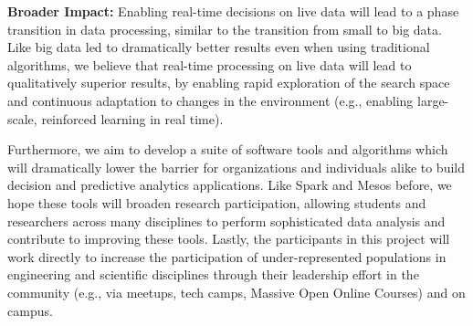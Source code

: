 \documentclass [10pt]{article}
\begin{document}
{{\bf Broader Impact:} Enabling real-time decisions on live data will lead to a phase transition in data processing, similar to the transition from small to big data. Like big data led to dramatically better results even when using traditional algorithms, we believe that real-time processing on live data will lead to qualitatively superior results, by enabling rapid exploration of the search space and continuous adaptation to changes in the environment (e.g., enabling large-scale, reinforced learning in real time).

Furthermore, we aim to develop a suite of software tools and algorithms which will dramatically lower the barrier for organizations and individuals alike to build decision and predictive analytics applications. Like Spark and Mesos before, we hope these tools will broaden research participation, allowing students and researchers across many disciplines to perform sophisticated data analysis and contribute to improving these tools. Lastly, the participants in this project will work directly to increase the participation of under-represented populations in engineering and scientific disciplines through their leadership effort in the community (e.g., via meetups, tech camps, Massive Open Online Courses) and on campus.


}
\newpage

\setcounter{section}{0}


\newpage
\pagestyle{plain}
\setcounter{page}{1}
\end{document}
